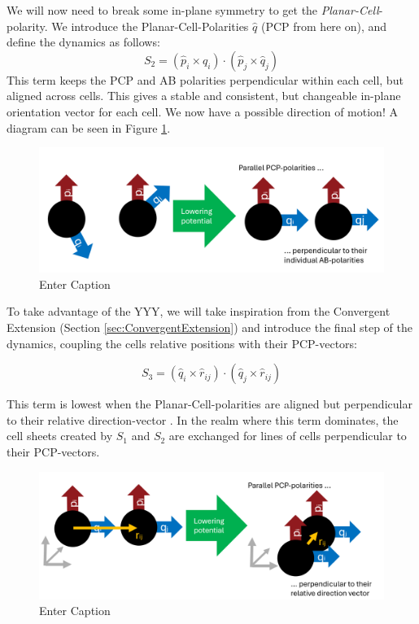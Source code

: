 We will now need to break some in-plane symmetry to get the \textit{Planar-Cell}-polarity. We introduce the Planar-Cell-Polarities $\hat{q}$ (PCP from here on), and define the dynamics as follows:
\begin{equation*}
    S_2=\left(\hat{p}_i \times \hat{q}_{i}\right) \cdot\left(\hat{p}_j \times \hat{q}_{j}\right)
\end{equation*}
This term keeps the PCP and AB polarities perpendicular within each cell, but aligned across cells. This gives a stable and consistent, but changeable in-plane orientation vector for each cell. We now have a possible direction of motion! A diagram can be seen in Figure \ref{fig:explain-S2}.\\
\begin{figure}[H]
    \centering
    \includegraphics[width=1\linewidth]{chapters//Theory//figures/explainS2.png}
    \caption{Enter Caption}
    \label{fig:explain-S2}
\end{figure}
To take advantage of the YYY, we will take inspiration from the Convergent Extension (Section \ref{sec:ConvergentExtension}) and introduce the final step of the dynamics, coupling the cells relative positions with their PCP-vectors:

\begin{equation*}
    S_3=\left(\hat{q}_i \times \hat{r}_{i j}\right) \cdot\left(\hat{q}_j \times \hat{r}_{i j}\right)
\end{equation*}

This term is lowest when the Planar-Cell-polarities are aligned but perpendicular to their relative direction-vector . In the realm where this term dominates, the cell sheets created by $S_1$ and $S_2$ are exchanged for lines of cells perpendicular to their PCP-vectors. 
\begin{figure}[H]
    \centering
    \includegraphics[width=1\linewidth]{chapters//Theory//figures/explainS3.png}
    \caption{Enter Caption}
    \label{fig:enter-label}
\end{figure}


